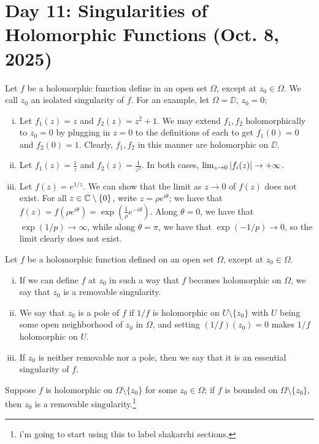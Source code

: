 \section{Day 11: Singularities of Holomorphic Functions (Oct. 8, 2025)}
Let $f$ be a holomorphic function define in an open set $\Omega$, except at $z_0 \in \Omega$. We call $z_0$ an isolated singularity of $f$. For an example, let $\Omega = \DD$, $z_0 = 0$;
\begin{enumerate}[(i)]
    \item Let $f_1(z) = z$ and $f_2(z) = z^2 + 1$. We may extend $f_1, f_2$ holomorphically to $z_0 = 0$ by plugging in $z = 0$ to the definitions of each to get $f_1(0) = 0$ and $f_2(0) = 1$. Clearly, $f_1, f_2$ in this manner are holomorphic on $\DD$.
    \item Let $f_1(z) = \frac{1}{z}$ and $f_2(z) = \frac{1}{z^2}$. In both cases, $\lim_{z \to 0} \left\lvert f_i(z) \right\rvert \to +\infty$.
    \item Let $f(z) = e^{1/z}$. We can show that the limit as $z \to 0$ of $f(z)$ does not exist. For all $z \in \mathbb C \setminus \{0\}$, write $z = \rho e^{i\theta}$; we have that $f(z) = f(\rho e^{i\theta}) = \exp(\frac{1}{\rho}e^{-i\theta})$. Along $\theta = 0$, we have that $\exp(1/p) \to \infty$, while along $\theta = \pi$, we have that $\exp(-1/p) \to 0$, so the limit clearly does not exist.
\end{enumerate}
\noindent Let $f$ be a holomorphic function defined on an open set $\Omega$, except at $z_0 \in \Omega$.
\begin{enumerate}[(i)]
    \item If we can define $f$ at $z_0$ in such a way that $f$ becomes holomorphic on $\Omega$, we say that $z_0$ is a removable singularity.
    \item We say that $z_0$ is a pole of $f$ if $1/f$ is holomorphic on $U \setminus \{z_0\}$ with $U$ being some open neighborhood of $z_0$ in $\Omega$, and setting $(1/f)(z_0) = 0$ makes $1/f$ holomorphic on $U$.
    \item If $z_0$ is neither removable nor a pole, then we say that it is an essential singularity of $f$.
\end{enumerate}
\begin{theorem}
    Suppose $f$ is holomorphic on $\Omega \setminus \{z_0\}$ for some $z_0 \in \Omega$; if $f$ is bounded on $\Omega \setminus \{z_0\}$, then $z_0$ is a removable singularity.\footnote{i'm going to start using this to label shakarchi sections.}
\end{theorem}
